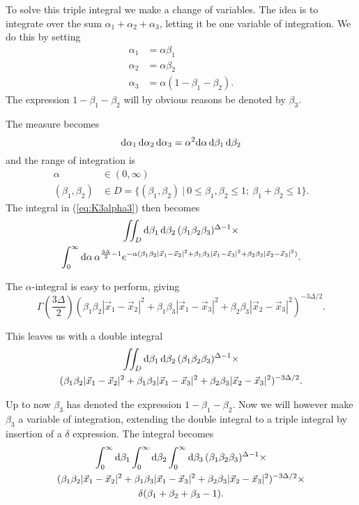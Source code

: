 To solve this triple integral we make a change of variables. The idea is to integrate over the sum $\alpha_1+\alpha_2+\alpha_3$, letting it be one variable of integration. We do this by setting
\begin{align*}
\alpha_1 &= \alpha \beta_1 \\
\alpha_2 &= \alpha \beta_2 \\
\alpha_3 &= \alpha (1-\beta_1-\beta_2).
\end{align*}
The expression $1-\beta_1-\beta_2$ will by obvious reasons be denoted by $\beta_3$.

The measure becomes
$$\mathrm{d}\alpha_1\, \mathrm{d}\alpha_2\, \mathrm{d}\alpha_3 = \alpha^2 \mathrm{d}\alpha\, \mathrm{d}\beta_1\, \mathrm{d}\beta_2$$
and the range of integration is
\begin{align*}
\alpha &\in (0,\infty) \\
(\beta_1,\beta_2) &\in D = \{ (\beta_1,\beta_2)\ |\ 0 \leq \beta_1,\beta_2 \leq 1;\ \beta_1+\beta_2 \leq 1\}.
\end{align*}
The integral in (\ref{eq:K3alpha3}) then becomes
\begin{multline*}
\int\!\!\!\int_D \mathrm{d}\beta_1\,\mathrm{d}\beta_2\, (\beta_1 \beta_2 \beta_3)^{\Delta-1} \times \\
\int_0^\infty \mathrm{d}\alpha\, \alpha^{\frac{3\Delta}{2}-1}
  e^{ -\alpha(\beta_1 \beta_2 |\vec{x}_1-\vec{x}_2|^2 +
              \beta_1 \beta_3 |\vec{x}_1-\vec{x}_3|^2 + 
              \beta_2 \beta_3 |\vec{x}_2-\vec{x}_3|^2) }.
\end{multline*}

The $\alpha$-integral is easy to perform, giving
$$\Gamma\left(\frac{3\Delta}{2}\right)
    (\beta_1 \beta_2 |\vec{x}_1-\vec{x}_2|^2 +
     \beta_1 \beta_3 |\vec{x}_1-\vec{x}_3|^2 + 
     \beta_2 \beta_3 |\vec{x}_2-\vec{x}_3|^2)^{-3\Delta/2}.
$$

This leaves us with a double integral
\begin{multline*}
  \int\!\!\!\int_D \mathrm{d}\beta_1\, \mathrm{d}\beta_2\,
    (\beta_1 \beta_2 \beta_3)^{\Delta-1} \times \\
    (\beta_1 \beta_2 |\vec{x}_1-\vec{x}_2|^2 +
     \beta_1 \beta_3 |\vec{x}_1-\vec{x}_3|^2 + 
     \beta_2 \beta_3 |\vec{x}_2-\vec{x}_3|^2)^{-3\Delta/2}.
\end{multline*}

Up to now $\beta_3$ has denoted the expression $1-\beta_1-\beta_2$. Now we will however make $\beta_3$ a variable of integration, extending the double integral to a triple integral by insertion of a $\delta$ expression. The integral becomes
\begin{multline*}
  \int_0^\infty \mathrm{d}\beta_1 \int_0^\infty \mathrm{d}\beta_2 \int_0^\infty \mathrm{d}\beta_3\,
    (\beta_1 \beta_2 \beta_3)^{\Delta-1} \times \\
    (\beta_1 \beta_2 |\vec{x}_1-\vec{x}_2|^2 +
     \beta_1 \beta_3 |\vec{x}_1-\vec{x}_3|^2 + 
     \beta_2 \beta_3 |\vec{x}_2-\vec{x}_3|^2)^{-3\Delta/2} \times \\
    \delta(\beta_1+\beta_2+\beta_3-1).
\end{multline*}

